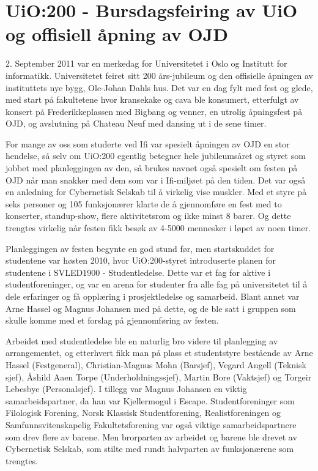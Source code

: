 \chapter[UiO:200]{UiO:200 - Bursdagsfeiring av UiO og offisiell åpning av OJD}

\author{Skrevet av Arne Hassel}

2. September 2011 var en merkedag for Universitetet i Oslo og Institutt for informatikk. Universitetet feiret sitt 200 års-jubileum og den offisielle åpningen av instituttets nye bygg, Ole-Johan Dahls hus. Det var en dag fylt med fest og glede, med start på fakultetene hvor kransekake og cava ble konsumert, etterfulgt av konsert på Frederikkeplassen med Bigbang og venner, en utrolig åpningsfest på OJD, og avslutning på Chateau Neuf med dansing ut i de sene timer.

For mange av oss som studerte ved Ifi var spesielt åpningen av OJD en stor hendelse, så selv om UiO:200 egentlig betegner hele jubileumsåret og styret som jobbet med planleggingen av den, så brukes navnet også spesielt om festen på OJD når man snakker med dem som var i Ifi-miljøet på den tiden. Det var også en anledning for Cybernetisk Selskab til å virkelig vise muskler. Med et styre på seks personer og 105 funksjonærer klarte de å gjennomføre en fest med to konserter, standup-show, flere aktivitetsrom og ikke minst 8 barer. Og dette trengtes virkelig når festen fikk besøk av 4-5000 mennesker i løpet av noen timer.

Planleggingen av festen begynte en god stund før, men startskuddet for studentene var høsten 2010, hvor UiO:200-styret introduserte planen for studentene i SVLED1900 - Studentledelse. Dette var et fag for aktive i studentforeninger, og var en arena for studenter fra alle fag på universitetet til å dele erfaringer og få opplæring i prosjektledelse og samarbeid. Blant annet var Arne Hassel og Magnus Johansen med på dette, og de ble satt i gruppen som skulle komme med et forslag på gjennomføring av festen.

Arbeidet med studentledelse ble en naturlig bro videre til planlegging av arrangementet, og etterhvert fikk man på plass et studentstyre bestående av Arne Hassel (Festgeneral), Christian-Magnus Mohn (Barsjef), Vegard Angell (Teknisk sjef), Åshild Aaen Torpe (Underholdningssjef), Martin Bore (Vaktsjef) og Torgeir Lebesbye (Personalsjef). I tillegg var Magnus Johansen en viktig samarbeidspartner, da han var Kjellermogul i Escape. Studentforeninger som Filologisk Forening, Norsk Klassisk Studentforening, Realistforeningen og Samfunnsvitenskapelig Fakultetsforening var også viktige samarbeidspartnere som drev flere av barene. Men brorparten av arbeidet og barene ble drevet av Cybernetisk Selskab, som stilte med rundt halvparten av funksjonærene som trengtes.

